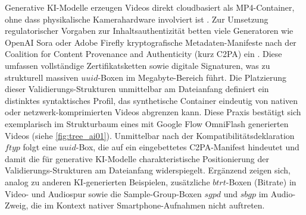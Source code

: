 Generative KI-Modelle erzeugen Videos direkt cloudbasiert als MP4-Container, ohne dass physikalische Kamerahardware involviert ist \cite{yang_comprehensive_2025}. Zur Umsetzung regulatorischer Vorgaben zur Inhaltsauthentizität betten viele Generatoren wie OpenAI Sora oder Adobe Firefly kryptografische Metadaten-Manifeste nach der Coalition for Content Provenance and Authenticity (kurz C2PA) ein \cite[Kap. 9]{c2pa_content_2024}. Diese umfassen vollständige Zertifikatsketten sowie digitale Signaturen, was zu strukturell massiven \(uuid\)-Boxen im Megabyte-Bereich führt. Die Platzierung dieser Validierungs-Strukturen unmittelbar am Dateianfang definiert ein distinktes syntaktisches Profil, das synthetische Container eindeutig von nativen oder netzwerk-komprimierten Videos abgrenzen kann. Diese Praxis bestätigt sich exemplarisch im Strukturbaum eines mit Google Flow OmniFlash generierten Videos (siehe \cref{fig:tree_ai01}). Unmittelbar nach der Kompatibilitätsdeklaration \(ftyp\) folgt eine \(uuid\)-Box, die auf ein eingebettetes C2PA-Manifest hindeutet und damit die für generative KI-Modelle charakteristische Positionierung der Validierungs-Strukturen am Dateianfang widerspiegelt. Ergänzend zeigen sich, analog zu anderen KI-generierten Beispielen, zusätzliche \(btrt\)-Boxen (Bitrate) in Video- und Audiospur sowie die Sample-Group-Boxen \(sgpd\) und \(sbgp\) im Audio-Zweig, die im Kontext nativer Smartphone-Aufnahmen nicht auftreten.